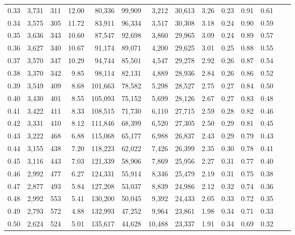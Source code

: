 \begin{tabular}{rrrrrrrrrrrrrr}
0.33 &  3,731 &  311 &   12.00 &   80,336 &   99,909 &   3,212 &  30,613 &  3.26 &  0.23 &  0.91 &      0.61 \\
0.34 &  3,575 &  305 &   11.72 &   83,911 &   96,334 &   3,517 &  30,308 &  3.18 &  0.24 &  0.90 &      0.59 \\
0.35 &  3,636 &  343 &   10.60 &   87,547 &   92,698 &   3,860 &  29,965 &  3.09 &  0.24 &  0.89 &      0.57 \\
0.36 &  3,627 &  340 &   10.67 &   91,174 &   89,071 &   4,200 &  29,625 &  3.01 &  0.25 &  0.88 &      0.55 \\
0.37 &  3,570 &  347 &   10.29 &   94,744 &   85,501 &   4,547 &  29,278 &  2.92 &  0.26 &  0.87 &      0.54 \\
0.38 &  3,370 &  342 &    9.85 &   98,114 &   82,131 &   4,889 &  28,936 &  2.84 &  0.26 &  0.86 &      0.52 \\
0.39 &  3,549 &  409 &    8.68 &  101,663 &   78,582 &   5,298 &  28,527 &  2.75 &  0.27 &  0.84 &      0.50 \\
0.40 &  3,430 &  401 &    8.55 &  105,093 &   75,152 &   5,699 &  28,126 &  2.67 &  0.27 &  0.83 &      0.48 \\
0.41 &  3,422 &  411 &    8.33 &  108,515 &   71,730 &   6,110 &  27,715 &  2.59 &  0.28 &  0.82 &      0.46 \\
0.42 &  3,331 &  410 &    8.12 &  111,846 &   68,399 &   6,520 &  27,305 &  2.50 &  0.29 &  0.81 &      0.45 \\
0.43 &  3,222 &  468 &    6.88 &  115,068 &   65,177 &   6,988 &  26,837 &  2.43 &  0.29 &  0.79 &      0.43 \\
0.44 &  3,155 &  438 &    7.20 &  118,223 &   62,022 &   7,426 &  26,399 &  2.35 &  0.30 &  0.78 &      0.41 \\
0.45 &  3,116 &  443 &    7.03 &  121,339 &   58,906 &   7,869 &  25,956 &  2.27 &  0.31 &  0.77 &      0.40 \\
0.46 &  2,992 &  477 &    6.27 &  124,331 &   55,914 &   8,346 &  25,479 &  2.19 &  0.31 &  0.75 &      0.38 \\
0.47 &  2,877 &  493 &    5.84 &  127,208 &   53,037 &   8,839 &  24,986 &  2.12 &  0.32 &  0.74 &      0.36 \\
0.48 &  2,992 &  553 &    5.41 &  130,200 &   50,045 &   9,392 &  24,433 &  2.05 &  0.33 &  0.72 &      0.35 \\
0.49 &  2,793 &  572 &    4.88 &  132,993 &   47,252 &   9,964 &  23,861 &  1.98 &  0.34 &  0.71 &      0.33 \\
0.50 &  2,624 &  524 &    5.01 &  135,617 &   44,628 &  10,488 &  23,337 &  1.91 &  0.34 &  0.69 &      0.32 \\

\end{tabular}
